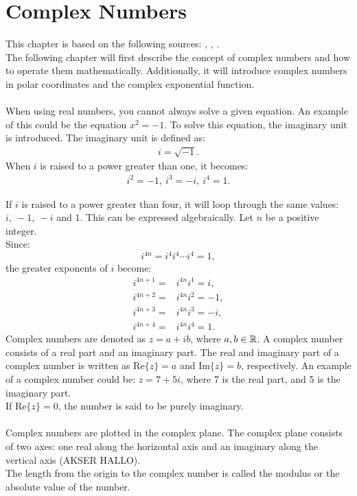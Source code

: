 \chapter{Complex Numbers}
This chapter is based on the following sources: \cite{complexpaul}, \cite{complexpurple}, \cite{complexnotebook}.
\\
\noindent 
The following chapter will first describe the concept of complex numbers and how to operate them mathematically. Additionally, it will introduce complex numbers in polar coordinates and the complex exponential function. %
\\\\
\noindent 
When using real numbers, you cannot always solve a given equation. An example of this could be the equation $x^2=-1$. To solve this equation, the imaginary unit is introduced. The imaginary unit is defined as:
\begin{align*}
i=\sqrt{-1}.
\end{align*}
When $i$ is raised to a power greater than one, it becomes:
\begin{align*}
i^2=-1,\  i^3=-i,\  i^4=1.
\end{align*}

\noindent If $i$ is raised to a power greater than four, it will loop through the same values: $i, \ -1, \ -i$ and $1$. This can be expressed algebraically. Let $n$ be a positive integer. 
\\
Since: $$i^{4n} = i^4i^4\cdots i^4 = 1,$$
the greater exponents of $i$ become:
\begin{align*}
	i^{4n+1} =& i^{4n}i^1 = i, \\
	i^{4n+2} =& i^{4n}i^2 = -1, \\
	i^{4n+3} =& i^{4n}i^3 = -i, \\
	i^{4n+4} =& i^{4n}i^4 = 1.
\end{align*}
Complex numbers are denoted as $z = a+ib$, where $a,b\in \mathbb{R}$. A complex number consists of a real part and an imaginary part. The real and imaginary part of a complex number is written as $\text{Re}\{z\}=a$ and $\text{Im}\{z\}=b$, respectively.
An example of a complex number could be: $z=7+5i$, where 7 is the real part, and 5 is the imaginary part. 
\\
If $\text{Re}\{z\}=0$, the number is said to be purely imaginary.  
\\\\
Complex numbers are plotted in the complex plane. The complex plane consists of two axes: one real along the horizontal axis and an imaginary along the vertical axis (AKSER HALLO).\\
The length from the origin to the complex number is called the modulus or the absolute value of the number.

